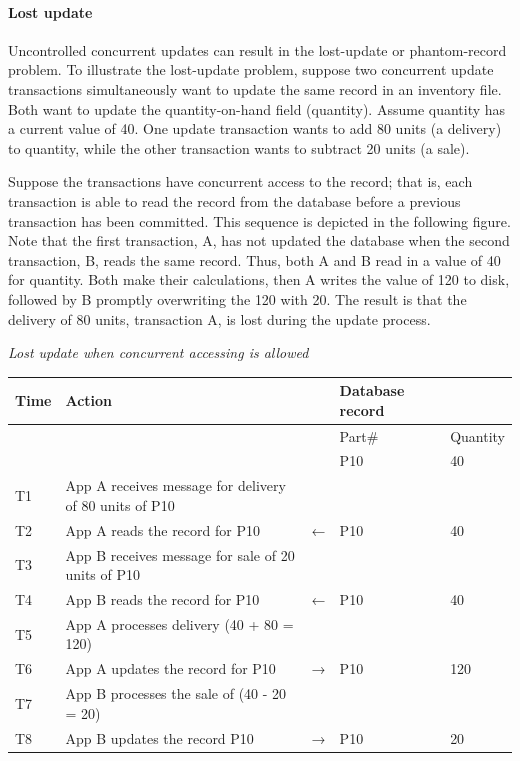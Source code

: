 \documentclass[
]{article}
\begin{document}
\hypertarget{lost-update}{%
\paragraph*{Lost update}\label{lost-update}}

Uncontrolled concurrent updates can result in the lost-update or
phantom-record problem. To illustrate the lost-update problem, suppose
two concurrent update transactions simultaneously want to update the
same record in an inventory file. Both want to update the
quantity-on-hand field (quantity). Assume quantity has a current value
of 40. One update transaction wants to add 80 units (a delivery) to
quantity, while the other transaction wants to subtract 20 units (a
sale).

Suppose the transactions have concurrent access to the record; that is,
each transaction is able to read the record from the database before a
previous transaction has been committed. This sequence is depicted in
the following figure. Note that the first transaction, A, has not
updated the database when the second transaction, B, reads the same
record. Thus, both A and B read in a value of 40 for quantity. Both make
their calculations, then A writes the value of 120 to disk, followed by
B promptly overwriting the 120 with 20. The result is that the delivery
of 80 units, transaction A, is lost during the update process.

\emph{Lost update when concurrent accessing is allowed}

\begin{longtable}[]{@{}lllll@{}}
\toprule
Time & Action & & Database record & \\
\midrule
\endhead
& & & Part\# & Quantity \\
& & & P10 & 40 \\
T1 & App A receives message for delivery of 80 units of P10 & & & \\
T2 & App A reads the record for P10 & ← & P10 & 40 \\
T3 & App B receives message for sale of 20 units of P10 & & & \\
T4 & App B reads the record for P10 & ← & P10 & 40 \\
T5 & App A processes delivery (40 + 80 = 120) & & & \\
T6 & App A updates the record for P10 & → & P10 & 120 \\
T7 & App B processes the sale of (40 - 20 = 20) & & & \\
T8 & App B updates the record P10 & → & P10 & 20 \\
\bottomrule
\end{longtable}
\end{document}
